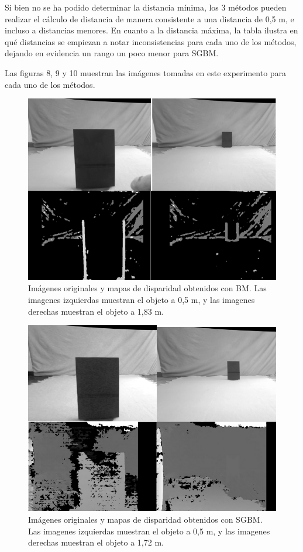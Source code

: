 \documentclass[11pt,a4paper,titlepage]{article}
\begin{document}
Si bien no se ha podido determinar la distancia mínima, los 3 métodos pueden realizar el cálculo de distancia de manera consistente a una distancia de 0,5 m, e incluso a distancias menores. En cuanto a la distancia máxima, la tabla ilustra en qué distancias se empiezan a notar inconsistencias para cada uno de los métodos, dejando en evidencia un rango un poco menor para SGBM.

Las figuras 8, 9 y 10 muestran las imágenes tomadas en este experimento para cada uno de los métodos.

\begin{figure}[h!]

  \centering
    \includegraphics[width=1\textwidth]{f8.png}
  \caption{Imágenes originales y mapas de disparidad obtenidos con BM. Las imagenes izquierdas muestran el objeto a 0,5 m, y las imagenes derechas muestran el objeto a 1,83 m.}
\end{figure}

\begin{figure}[h!]

  \centering
    \includegraphics[width=1\textwidth]{f9.png}
  \caption{Imágenes originales y mapas de disparidad obtenidos con SGBM. Las imagenes izquierdas muestran el objeto a 0,5 m, y las imagenes derechas muestran el objeto a 1,72 m.}
\end{figure}
\end{document}
